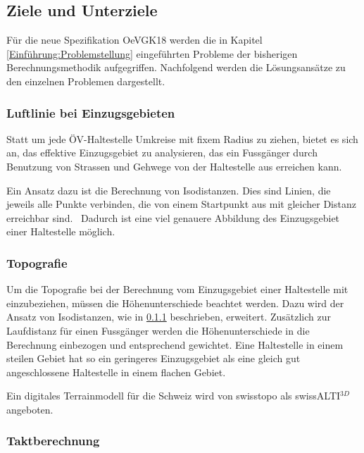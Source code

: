 \subsection{Ziele und Unterziele}
\label{Einführung:Ziele und Unterziele}

Für die neue Spezifikation \gls{OeVGK18} werden die in Kapitel \ref{Einführung:Problemstellung} eingeführten Probleme der bisherigen Berechnungsmethodik aufgegriffen.
Nachfolgend werden die Lösungsansätze zu den einzelnen Problemen dargestellt.


\subsubsection{Luftlinie bei Einzugsgebieten}
\label{solution:Luftlinie bei Einzugsgebieten}

Statt um jede \acs{ÖV}-Haltestelle Umkreise mit fixem Radius zu ziehen, bietet es sich an, das effektive Einzugsgebiet zu analysieren, das ein Fussgänger durch Benutzung von Strassen und Gehwege von der Haltestelle aus erreichen kann.

Ein Ansatz dazu ist die Berechnung von Isodistanzen.
Dies sind Linien, die jeweils alle Punkte verbinden, die von einem Startpunkt aus mit gleicher Distanz erreichbar sind.~\cite{isodistance_gislounge}
Dadurch ist eine viel genauere Abbildung des Einzugsgebiet einer Haltestelle möglich.


\subsubsection{Topografie}
\label{solution:Topografie}

Um die Topografie bei der Berechnung vom Einzugsgebiet einer Haltestelle mit einzubeziehen, müssen die Höhenunterschiede beachtet werden.
Dazu wird der Ansatz von Isodistanzen, wie in \ref{solution:Luftlinie bei Einzugsgebieten} beschrieben, erweitert. Zusätzlich zur Laufdistanz für einen Fussgänger werden die Höhenunterschiede in die Berechnung einbezogen und entsprechend gewichtet.
Eine Haltestelle in einem steilen Gebiet hat so ein geringeres Einzugsgebiet als eine gleich gut angeschlossene Haltestelle in einem flachen Gebiet.

Ein digitales \gls{Terrainmodell} für die Schweiz wird von swisstopo als swissALTI$^{3D}$ angeboten.~\cite{swissalti3d_swisstopo}

\subsubsection{Taktberechnung}
\label{solution:Taktberechnung}

